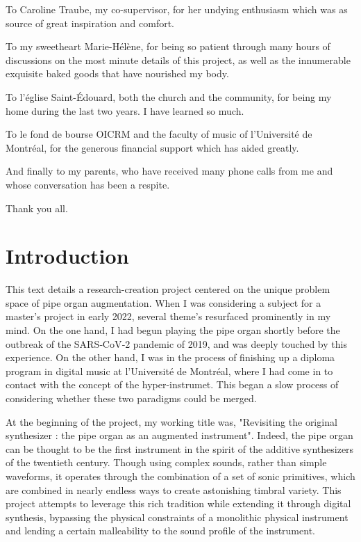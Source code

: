 \documentclass[12pt,twoside,maitrise]{dms_ks}
\theoremstyle{definition}
\begin{document}
To Caroline Traube, my co-supervisor, for her undying enthusiasm which was as source of great inspiration and comfort.

To my sweetheart Marie-Hélène, for being so patient through many hours of discussions on the most minute details of this project, as well as the innumerable exquisite baked goods that have nourished my body.

To l'église Saint-Édouard, both the church and the community, for being my home during the last two years. I have learned so much.

To le fond de bourse OICRM and the faculty of music of l'Université de Montréal, for the generous financial support which has aided greatly.

And finally to my parents, who have received many phone calls from me and whose conversation has been a respite.

Thank you all.


\NoChapterPageNumber
\cleardoublepage


\chapter*{Introduction}

This text details a research-creation project centered on the unique problem space of pipe organ augmentation. 
When I was considering a subject for a master's project in early 2022, several theme's resurfaced prominently in my mind. 
On the one hand, I had begun playing the pipe organ shortly before the outbreak of the SARS‑CoV‑2 pandemic of 2019, and was deeply touched by this experience. 
On the other hand, I was in the process of finishing up a diploma program in digital music at l'Université de Montréal, where I had come in to contact with the concept of the hyper-instrumet. 
This began a slow process of considering whether these two paradigms could be merged. 

At the beginning of the project, my working title was, "Revisiting the original synthesizer : the pipe organ as an augmented instrument". 
Indeed, the pipe organ can be thought to be the first instrument in the spirit of the additive synthesizers of the twentieth century. 
Though using complex sounds, rather than simple waveforms, it operates through the combination of a set of sonic primitives, which are combined in nearly endless ways to create astonishing timbral variety. 
This project attempts to leverage this rich tradition while extending it through digital synthesis, bypassing the physical constraints of a monolithic physical instrument and lending a certain malleability to the sound profile of the instrument.
\end{document}
